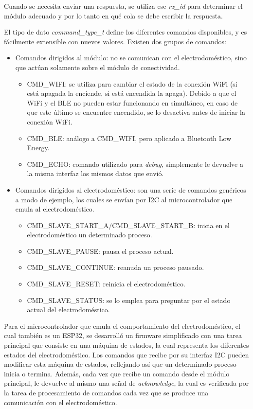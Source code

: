 Cuando se necesita enviar una respuesta, se utiliza ese \emph{rx\_id} para determinar el módulo adecuado y por lo tanto en qué cola se debe escribir la respuesta.

El tipo de dato \emph{command\_type\_t} define los diferentes comandos disponibles, y es fácilmente extensible con nuevos valores. Existen dos grupos de comandos:

\begin{itemize}
	\item Comandos dirigidos al módulo: no se comunican con el electrodoméstico, sino que actúan solamente sobre el módulo de conectividad.
	\begin{itemize}
		\item CMD\_WIFI: se utiliza para cambiar el estado de la conexión WiFi (si está apagada la enciende, si está encendida la apaga). Debido a que el WiFi y el BLE no pueden estar funcionando en simultáneo, en caso de que este último se encuentre encendido, se lo desactiva antes de iniciar la conexión WiFi.
		\item CMD\_BLE: análogo a CMD\_WIFI, pero aplicado a Bluetooth Low Energy.
		\item CMD\_ECHO: comando utilizado para \emph{debug}, simplemente le devuelve a la misma interfaz los mismos datos que envió.
	\end{itemize}
	\item Comandos dirigidos al electrodoméstico: son una serie de comandos genéricos a modo de ejemplo, los cuales se envían por I2C al microcontrolador que emula al electrodoméstico.
	\begin{itemize}
		\item CMD\_SLAVE\_START\_A/CMD\_SLAVE\_START\_B: inicia en el electrodoméstico un determinado proceso.
		\item CMD\_SLAVE\_PAUSE: pausa el proceso actual.
		\item CMD\_SLAVE\_CONTINUE: reanuda un proceso pausado.
		\item CMD\_SLAVE\_RESET: reinicia el electrodoméstico.
		\item CMD\_SLAVE\_STATUS: se lo emplea para preguntar por el estado actual del electrodoméstico.
	\end{itemize}
\end{itemize}

Para el microcontrolador que emula el comportamiento del electrodoméstico, el cual también es un ESP32, se desarrolló un firmware simplificado con una tarea principal que consiste en una máquina de estados, la cual representa los diferentes estados del electrodoméstico. Los comandos que recibe por su interfaz I2C pueden modificar esta máquina de estados, reflejando así que un determinado proceso inicia o termina. Además, cada vez que recibe un comando desde el módulo principal, le devuelve al mismo una señal de \emph{acknowledge}, la cual es verificada por la tarea de procesamiento de comandos cada vez que se produce una comunicación con el electrodoméstico.

